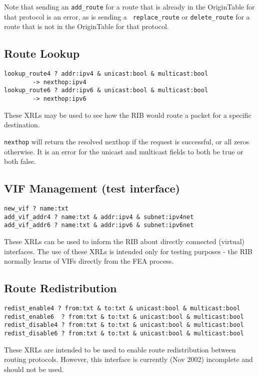 \documentclass[11pt]{article}
\begin{document}
Note that sending an {\tt add\_route} for a route that is already in
the OriginTable for that protocol is an error, as is sending a {\tt
replace\_route} or {\tt delete\_route} for a route that is not in the
OriginTable for that protocol.

\subsection{Route Lookup}
\begin{verbatim}
lookup_route4 ? addr:ipv4 & unicast:bool & multicast:bool 
        -> nexthop:ipv4
lookup_route6 ? addr:ipv6 & unicast:bool & multicast:bool 
        -> nexthop:ipv6
\end{verbatim}
These XRLs may be used to see how the RIB would route a packet for a
specific destination.

{\tt nexthop} will return the resolved nexthop if the request is successful,
or all zeros otherwise.  It is an error for the unicast and multicast
fields to both be true or both false.

\subsection{VIF Management (test interface)}
\begin{verbatim}
new_vif ? name:txt
add_vif_addr4 ? name:txt & addr:ipv4 & subnet:ipv4net
add_vif_addr6 ? name:txt & addr:ipv6 & subnet:ipv6net
\end{verbatim}
These XRLs can be used to inform the RIB about directly connected
(virtual) interfaces.  The use of these XRLs is intended only for
testing purposes - the RIB normally learns of VIFs directly from the
FEA process.
 
\subsection{Route Redistribution}
\begin{verbatim}
redist_enable4 ? from:txt & to:txt & unicast:bool & multicast:bool
redist_enable6  ? from:txt & to:txt & unicast:bool & multicast:bool
redist_disable4 ? from:txt & to:txt & unicast:bool & multicast:bool
redist_disable6 ? from:txt & to:txt & unicast:bool & multicast:bool
\end{verbatim}
These XRLs are intended to be used to enable route redistribution
between routing protocols.  However, this interface is currently (Nov
2002) incomplete and should not be used.
\end{document}
